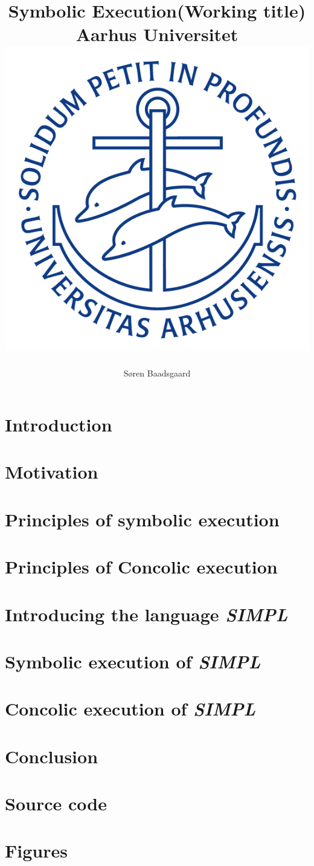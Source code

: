 \documentclass[]{report}
\title{
	\textbf{Symbolic Execution(Working title)}\\
	{\large Aarhus Universitet}\\
	{\includegraphics[scale=0.5]{ausegl_blaa.png}}	
	}
\author{Søren Baadsgaard}
\newcommand{\explanguage}{\textsl{SIMPL }}
\begin{document}
\maketitle

\begin{abstract}
\end{abstract}

\tableofcontents

\chapter{Introduction}
	
	
\chapter{Motivation}
	
\chapter{Principles of symbolic execution}
	

\chapter{Principles of Concolic execution}
	
\chapter{Introducing the language \explanguage}
	
\chapter{Symbolic execution of \explanguage}
\chapter{Concolic execution of \explanguage}

\chapter{Conclusion}
	

\appendix

\chapter{Source code}

\chapter{Figures}



\end{document}
